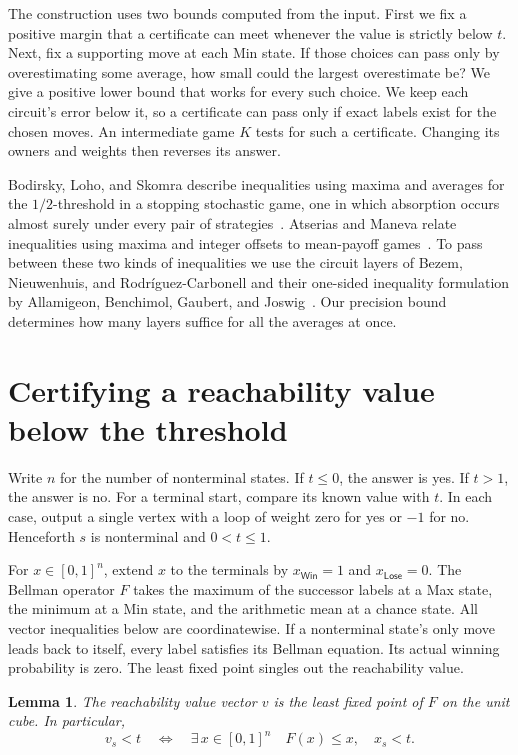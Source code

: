 \documentclass[11pt,letterpaper]{article}
\newtheorem{lemma}[theorem]{Lemma}
\newcommand{\Win}{\mathsf{Win}}
\newcommand{\Lose}{\mathsf{Lose}}
\begin{document}
The construction uses two bounds computed from the input. First we fix a
positive margin that a certificate can meet whenever the value is strictly
below \(t\). Next, fix a supporting move at each Min state. If those choices
can pass only by overestimating some average, how small could the largest
overestimate be? We give a positive lower bound that works for every such
choice. We keep each circuit's error below it, so a certificate can pass
only if exact labels exist for the chosen moves. An intermediate game \(K\)
tests for such a certificate. Changing its owners and weights then reverses
its answer.

Bodirsky, Loho, and Skomra describe inequalities using maxima and averages for
the \(1/2\)-threshold in a stopping stochastic game, one in which absorption
occurs almost surely under every pair of strategies~\cite[Prop.~5]{bls}.
Atserias and Maneva relate inequalities using maxima and integer offsets to
mean-payoff games~\cite{am}. To pass between these two kinds of inequalities
we use the circuit layers of Bezem, Nieuwenhuis, and Rodr\'iguez-Carbonell and
their one-sided inequality formulation by Allamigeon, Benchimol, Gaubert, and
Joswig~\cite[\S3]{bnr}\cite[Prop.~20]{abgj}. Our precision bound determines how
many layers suffice for all the averages at once.

\section{Certifying a reachability value below the threshold}
\label{sec:reach}

Write \(n\) for the number of nonterminal states. If \(t\le 0\), the answer is yes.
If \(t>1\), the answer is no. For a terminal start, compare its known value with \(t\).
In each case, output a single vertex with a loop of weight zero for yes or \(-1\) for
no. Henceforth \(s\) is nonterminal and \(0<t\le 1\).

For \(x\in[0,1]^n\), extend \(x\) to the terminals by \(x_{\Win}=1\) and \(x_{\Lose}=0\).
The Bellman operator \(F\) takes the maximum of the successor labels at a Max state,
the minimum at a Min state, and the arithmetic mean at a chance state. All vector
inequalities below are coordinatewise. If a nonterminal state's only move
leads back to itself, every label satisfies its Bellman equation. Its actual
winning probability is zero. The least fixed point singles out the reachability
value.

\begin{lemma}\label{lem:reach}
The reachability value vector \(v\) is the least fixed point of \(F\) on the unit cube.
In particular,
\[
 v_s<t
 \quad\Longleftrightarrow\quad
 \exists\,x\in[0,1]^n\quad F(x)\le x,\quad x_s<t .
\]
\end{lemma}
\end{document}
